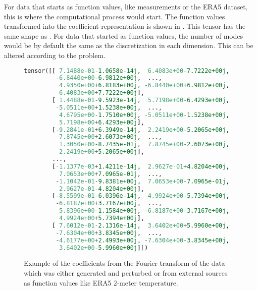 For data that starts as function values, like measurements or the ERA5 dataset, this is where the computational process would start. The function values transformed into the coefficient representation is shown in . This tensor has the same shape as . For data that started as function values, the number of modes would be by default the same as the discretization in each dimension. This can be altered according to the problem.
\begin{figure}[H]
  \centering
  \begin{lstlisting}[language=Python]
tensor([[ 7.1488e-01-1.0658e-14j,  6.4083e+00-7.7222e+00j,
         -6.8440e+00-6.9812e+00j,  ...,
          4.9350e+00+6.8183e+00j, -6.8440e+00+6.9812e+00j,
          6.4083e+00+7.7222e+00j],
        [ 1.4488e-01-9.5923e-14j,  5.7198e+00-6.4293e+00j,
         -5.0511e+00+1.5238e+00j,  ...,
          4.6795e+00-1.7510e+00j, -5.0511e+00-1.5238e+00j,
          5.7198e+00+6.4293e+00j],
        [-9.2841e-01+6.3949e-14j,  2.2419e+00-5.2065e+00j,
          7.8745e+00+2.6073e+00j,  ...,
          1.3050e+00-8.7435e-01j,  7.8745e+00-2.6073e+00j,
          2.2419e+00+5.2065e+00j],
        ...,
        [-1.1377e-03+1.4211e-14j,  2.9627e-01+4.8204e+00j,
          7.0653e+00+7.0965e-01j,  ...,
         -1.1042e-01-9.8381e+00j,  7.0653e+00-7.0965e-01j,
          2.9627e-01-4.8204e+00j],
        [-8.5599e-01-6.0396e-14j,  4.9924e+00-5.7394e+00j,
         -6.8187e+00+3.7167e+00j,  ...,
          5.8396e+00-1.1584e+00j, -6.8187e+00-3.7167e+00j,
          4.9924e+00+5.7394e+00j],
        [ 7.6012e-01-2.1316e-14j,  3.6402e+00+5.9960e+00j,
         -7.6304e+00+3.8345e+00j,  ...,
         -4.6177e+00+2.4993e+00j, -7.6304e+00-3.8345e+00j,
          3.6402e+00-5.9960e+00j]])
\end{lstlisting}
  \caption{Example of the coefficients from the Fourier transform of the data which was either generated and perturbed or from external sources as function values like ERA5 2-meter temperature.}\label{fig:example_data_fourier_transformed}
\end{figure}

